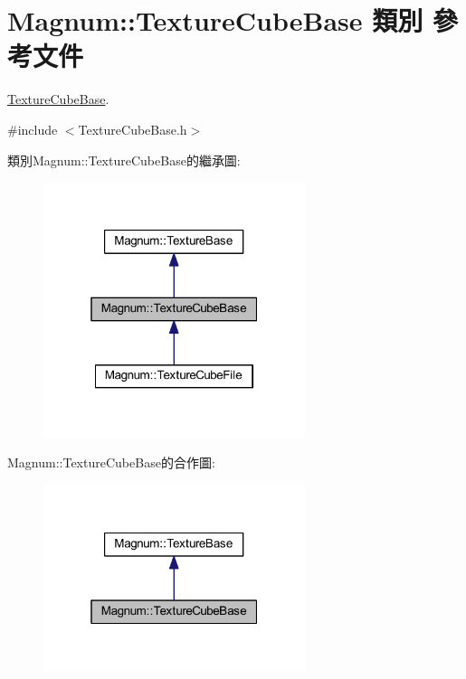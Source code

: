 \hypertarget{class_magnum_1_1_texture_cube_base}{}\section{Magnum\+:\+:Texture\+Cube\+Base 類別 參考文件}
\label{class_magnum_1_1_texture_cube_base}


\hyperlink{class_magnum_1_1_texture_cube_base}{Texture\+Cube\+Base}.  




{\ttfamily \#include $<$Texture\+Cube\+Base.\+h$>$}



類別\+Magnum\+:\+:Texture\+Cube\+Base的繼承圖\+:\nopagebreak
\begin{figure}[H]
\begin{center}
\leavevmode
\includegraphics[width=217pt]{class_magnum_1_1_texture_cube_base__inherit__graph}
\end{center}
\end{figure}


Magnum\+:\+:Texture\+Cube\+Base的合作圖\+:\nopagebreak
\begin{figure}[H]
\begin{center}
\leavevmode
\includegraphics[width=217pt]{class_magnum_1_1_texture_cube_base__coll__graph}
\end{center}
\end{figure}
